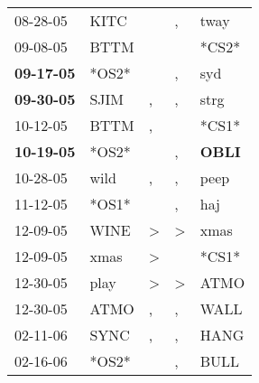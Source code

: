 \begin{supertabular}{p{0.07\textwidth}p{0.06\textwidth}p{0.02\textwidth}p{0.02\textwidth}p{0.06\textwidth}}
          08-28-05\textsuperscript{} &           KITC\textsuperscript{} &                  &                , &           tway\textsuperscript{} \\
          09-08-05\textsuperscript{} &           BTTM\textsuperscript{} &                  &                  &                            *CS2* \\
 \textbf{09-17-05\textsuperscript{}} &                            *OS2* &                  &                , &            syd\textsuperscript{} \\
 \textbf{09-30-05\textsuperscript{}} &           SJIM\textsuperscript{} &                , &                , &           strg\textsuperscript{} \\
          10-12-05\textsuperscript{} &           BTTM\textsuperscript{} &                , &                  &                            *CS1* \\
 \textbf{10-19-05\textsuperscript{}} &                            *OS2* &                  &                , &  \textbf{OBLI\textsuperscript{}} \\
          10-28-05\textsuperscript{} &           wild\textsuperscript{} &                , &                , &           peep\textsuperscript{} \\
          11-12-05\textsuperscript{} &                            *OS1* &                  &                , &            haj\textsuperscript{} \\
          12-09-05\textsuperscript{} &           WINE\textsuperscript{} &     \textgreater &     \textgreater &           xmas\textsuperscript{} \\
          12-09-05\textsuperscript{} &           xmas\textsuperscript{} &     \textgreater &                  &                            *CS1* \\
          12-30-05\textsuperscript{} &           play\textsuperscript{} &     \textgreater &     \textgreater &           ATMO\textsuperscript{} \\
          12-30-05\textsuperscript{} &           ATMO\textsuperscript{} &                , &                , &           WALL\textsuperscript{} \\
          02-11-06\textsuperscript{} &           SYNC\textsuperscript{} &                , &                , &           HANG\textsuperscript{} \\
          02-16-06\textsuperscript{} &                            *OS2* &                  &                , &           BULL\textsuperscript{} \\

\end{supertabular}
